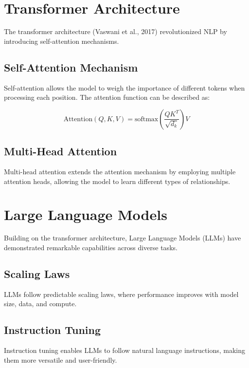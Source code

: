 \documentclass{article}
\begin{document}
\section{Transformer Architecture}

The transformer architecture (Vaswani et al., 2017) revolutionized NLP by introducing self-attention mechanisms.

\subsection{Self-Attention Mechanism}

Self-attention allows the model to weigh the importance of different tokens when processing each position. The attention function can be described as:

\begin{equation}
\text{Attention}(Q, K, V) = \text{softmax}\left(\frac{QK^T}{\sqrt{d_k}}\right)V
\end{equation}

\subsection{Multi-Head Attention}

Multi-head attention extends the attention mechanism by employing multiple attention heads, allowing the model to learn different types of relationships.

\section{Large Language Models}

Building on the transformer architecture, Large Language Models (LLMs) have demonstrated remarkable capabilities across diverse tasks.

\subsection{Scaling Laws}

LLMs follow predictable scaling laws, where performance improves with model size, data, and compute.

\subsection{Instruction Tuning}

Instruction tuning enables LLMs to follow natural language instructions, making them more versatile and user-friendly.
\end{document}
